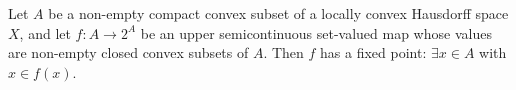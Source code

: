 Let $A$ be a non-empty compact convex subset of a locally convex Hausdorff space $X$, and let $f: A \to 2^A$ be an upper semicontinuous set-valued map whose values are non-empty closed convex subsets of $A$. Then $f$ has a fixed point: $\exists x \in A$ with $x \in f(x)$.